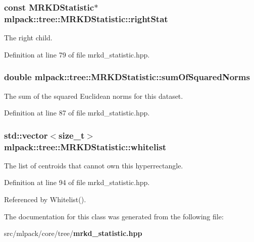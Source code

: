 \subsubsection[{right\-Stat}]{\setlength{\rightskip}{0pt plus 5cm}const {\bf M\-R\-K\-D\-Statistic}$\ast$ mlpack\-::tree\-::\-M\-R\-K\-D\-Statistic\-::right\-Stat\hspace{0.3cm}{\ttfamily [private]}}\label{classmlpack_1_1tree_1_1MRKDStatistic_a7800ca67a1c09c07cddb0394a389aea9}


The right child. 



Definition at line 79 of file mrkd\-\_\-statistic.\-hpp.

\subsubsection[{sum\-Of\-Squared\-Norms}]{\setlength{\rightskip}{0pt plus 5cm}double mlpack\-::tree\-::\-M\-R\-K\-D\-Statistic\-::sum\-Of\-Squared\-Norms\hspace{0.3cm}{\ttfamily [private]}}\label{classmlpack_1_1tree_1_1MRKDStatistic_ad28fc8dbf11f3e4e58bc3505cf1d90a9}


The sum of the squared Euclidean norms for this dataset. 



Definition at line 87 of file mrkd\-\_\-statistic.\-hpp.

\subsubsection[{whitelist}]{\setlength{\rightskip}{0pt plus 5cm}std\-::vector$<$size\-\_\-t$>$ mlpack\-::tree\-::\-M\-R\-K\-D\-Statistic\-::whitelist\hspace{0.3cm}{\ttfamily [private]}}\label{classmlpack_1_1tree_1_1MRKDStatistic_a653ab559b163e1769ef20d0ca8a73ccf}


The list of centroids that cannot own this hyperrectangle. 



Definition at line 94 of file mrkd\-\_\-statistic.\-hpp.



Referenced by Whitelist().



The documentation for this class was generated from the following file\-:\begin{DoxyCompactItemize}
\item 
src/mlpack/core/tree/{\bf mrkd\-\_\-statistic.\-hpp}\end{DoxyCompactItemize}
